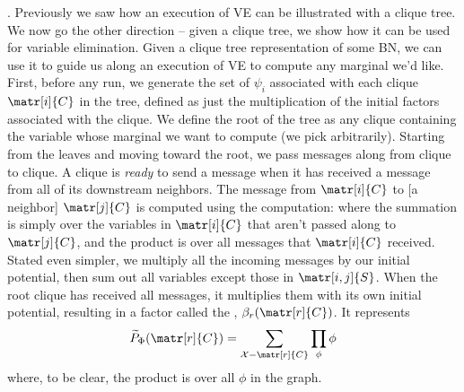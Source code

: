 \documentclass[11pt]{article}
\newcommand\myspace[1][]{\vspace{#1\bigskipamount}}
\newcommand\p{\Needspace{10\baselineskip} \noindent}
\newcommand\tlab[1]{\tag{#1}\label{#1}}
\begin{document}
\myspace
\p {}. Previously we saw how an execution of VE can be illustrated with a clique tree. We now go the other direction -- given a clique tree, we show how it can be used for variable elimination. Given a clique tree representation of some BN, we can use it to guide us along an execution of VE to compute any marginal we'd like. First, before any run, we generate the set of  $\psi_i$ associated with each clique $\matr[i]{C}$ in the tree, defined as just the multiplication of the initial factors associated with the clique. We define the root of the tree as any clique containing the variable whose marginal we want to compute (we pick arbitrarily). Starting from the leaves and moving toward the root, we pass messages along from clique to clique. A clique is \textit{ready} to send a message when it has received a message from all of its downstream neighbors. The message from $\matr[i]{C}$ to [a neighbor] $\matr[j]{C}$ is computed using the  computation:
\graybox{
	\delta_{i \rightarrow j} &= \sum_{ \matr[i]{C} - \matr[i,j]{S}  }	\psi_i \cdot \prod_{k \in ( Nb_i - \{j\}   )} \delta_{k \rightarrow i} \tlab{10.2}
}
where the summation is simply over the variables in $\matr[i]{C}$ that aren't passed along to $\matr[j]{C}$, and the product is over all messages that $\matr[i]{C}$ received. Stated even simpler, we multiply all the incoming messages by our initial potential, then sum out all variables except those in $\matr[i,j]{S}$. When the root clique has received all messages, it multiplies them with its own initial potential, resulting in a factor called the , $\beta_r(\matr[r]{C})$. It represents
\begin{align}
	\widetilde{P}_{\Phi}(\matr[r]{C}) = \sum_{\mathcal X - \matr[r]{C}} \prod_{\phi} \phi
\end{align}
where, to be clear, the product is over all $\phi$ in the graph. \\
\end{document}
